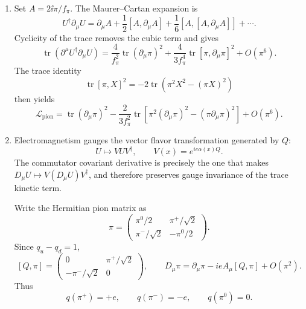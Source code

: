 \begin{enumerate}
\begin{enumerate}
    \item[(iii)]
    Set \(A=2\ii\pi/f_\pi\).  The Maurer--Cartan expansion is
    \[
      U^\dagger\partial_\mu U
       =\partial_\mu A+\frac12[A,\partial_\mu A]
        +\frac16[A,[A,\partial_\mu A]]+\cdots.
    \]
    Cyclicity of the trace removes the cubic term and gives
    \[
      \operatorname{tr}(\partial^\mu U^\dagger\partial_\mu U)
       =\frac4{f_\pi^2}\operatorname{tr}(\partial_\mu\pi)^2
        +\frac4{3f_\pi^4}
          \operatorname{tr}[\pi,\partial_\mu\pi]^2+O(\pi^6).
    \]
    The trace identity
    \[
      \operatorname{tr}[\pi,X]^2
        =-2\operatorname{tr}\!\left(\pi^2X^2-(\pi X)^2\right)
    \]
    then yields
    \[
      \boxed{\mathcal L_{\mathrm{pion}}
        =\operatorname{tr}(\partial_\mu\pi)^2
        -\frac{2}{3f_\pi^2}
          \operatorname{tr}\!\left[
            \pi^2(\partial_\mu\pi)^2-(\pi\partial_\mu\pi)^2
          \right]+O(\pi^6).}
    \]

    \item[(iv)]
    Electromagnetism gauges the vector flavor transformation generated by
    \(Q\):
    \[
      U\mapsto VUV^\dagger,
      \qquad V(x)=e^{ie\alpha(x)Q}.
    \]
    The commutator covariant derivative is precisely the one that makes
    \(D_\mu U\mapsto V(D_\mu U)V^\dagger\), and therefore preserves gauge
    invariance of the trace kinetic term.

    Write the Hermitian pion matrix as
    \[
      \pi=\begin{pmatrix}
        \pi^0/2&\pi^+/\sqrt2\\[2pt]
        \pi^-/\sqrt2&-\pi^0/2
      \end{pmatrix}.
    \]
    Since \(q_u-q_d=1\),
    \[
      [Q,\pi]=\begin{pmatrix}
        0&\pi^+/\sqrt2\\[2pt]
        -\pi^-/\sqrt2&0
      \end{pmatrix},
      \qquad
      D_\mu\pi=\partial_\mu\pi-ieA_\mu[Q,\pi]+O(\pi^2).
    \]
    Thus
    \[
      \boxed{q(\pi^+)=+e,\qquad q(\pi^-)=-e,\qquad q(\pi^0)=0.}
    \]
  \end{enumerate}


\end{enumerate}
